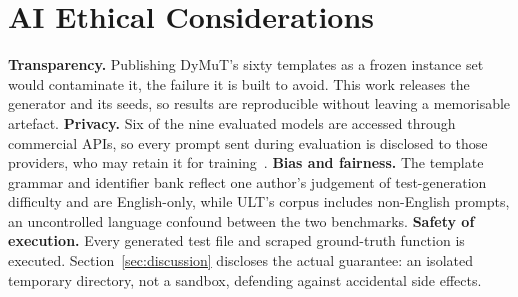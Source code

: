 \section{AI Ethical Considerations}
\label{sec:ethics}

\textbf{Transparency.} Publishing DyMuT's sixty templates as a frozen instance set would contaminate it, the failure it is built to avoid. This work releases the generator and its seeds, so results are reproducible without leaving a memorisable artefact. \textbf{Privacy.} Six of the nine evaluated models are accessed through commercial APIs, so every prompt sent during evaluation is disclosed to those providers, who may retain it for training~\cite{balloccu2024leakcheat}. \textbf{Bias and fairness.} The template grammar and identifier bank reflect one author's judgement of test-generation difficulty and are English-only, while ULT's corpus includes non-English prompts, an uncontrolled language confound between the two benchmarks. \textbf{Safety of execution.} Every generated test file and scraped ground-truth function is executed. Section~\ref{sec:discussion} discloses the actual guarantee: an isolated temporary directory, not a sandbox, defending against accidental side effects.
